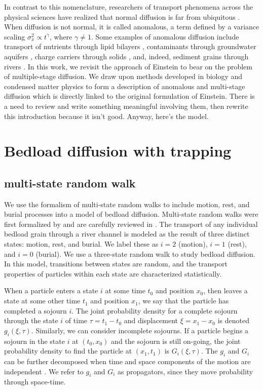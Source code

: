 \documentclass[]{agujournal2018}
\begin{document}
In contrast to this nomenclature, researchers of transport phenomena across the physical sciences have realized that normal diffusion is far from ubiquitous \citep{Shlesinger1993}.
When diffusion is not normal, it is called anomalous, a term defined by a variance scaling $\sigma_x^2 \propto t^\gamma$, where $\gamma \neq 1$. 
Some examples of anomalous diffusion include transport of nutrients through lipid bilayers \citep[e.g.][]{Jeon2012,Molina-Garcia2018}, contaminants through groundwater aquifers \citep[e.g.][]{AaraoReis2014,Yang2019}, charge carriers through solids \citep[e.g.][]{Scher1973}, and, indeed, sediment grains through rivers \citep{Hassan2017,Phillips2013,Martin2012,Bradley2017}.
In this work, we revisit the approach of Einstein to bear on the problem of multiple-stage diffusion.
We draw upon methods developed in biology and condensed matter physics to form a description of anomalous and multi-stage diffusion which is directly linked to the original formulation of Einstein.
There is a need to review \citet{Wu2019, Zhang2012, Hassan2017, Phillips2013, Martin2012} and write something meaningful involving them, then rewrite this introduction because it isn't good.
Anyway, here's the model.


\section{Bedload diffusion with trapping}

\subsection{multi-state random walk}
We use the formalism of multi-state random walks to include motion, rest, and burial processes into a model of bedload diffusion.
Multi-state random walks were first formalized by \citet{Weiss1976} and are carefully reviewed in \citet{Weiss1994}.
The transport of any individual bedload grain through a river channel is modeled as the result of three distinct states: motion, rest, and burial.
We label these as $i=2$ (motion), $i=1$ (rest), and $i=0$ (burial).
We use a three-state random walk to study bedload diffusion.
In this model, transitions between states are random, and the transport properties of particles within each state are characterized statistically.

When a particle enters a state $i$ at some time $t_0$ and position $x_0$, then leaves a state at some other time $t_1$ and position $x_1$, we say that the particle has completed a sojourn $i$. The joint probability density for a complete sojourn through the state $i$ of time $\tau = t_1-t_0$ and displacement $\xi = x_1-x_0$ is denoted $g_i(\xi,\tau).$ Similarly, we can consider incomplete sojourns. If a particle begins a sojourn in the state $i$ at $(t_0,x_0)$ and the sojourn is still on-going, the joint probability density to find the particle at $(x_1,t_1)$ is $G_i(\xi,\tau)$. The $g_i$ and $G_i$ can be further decomposed when time and space components of the motion are independent \citep{Weiss1994}.
We refer to $g_i$ and $G_i$ as propagators, since they move probability through space-time.
\end{document}

